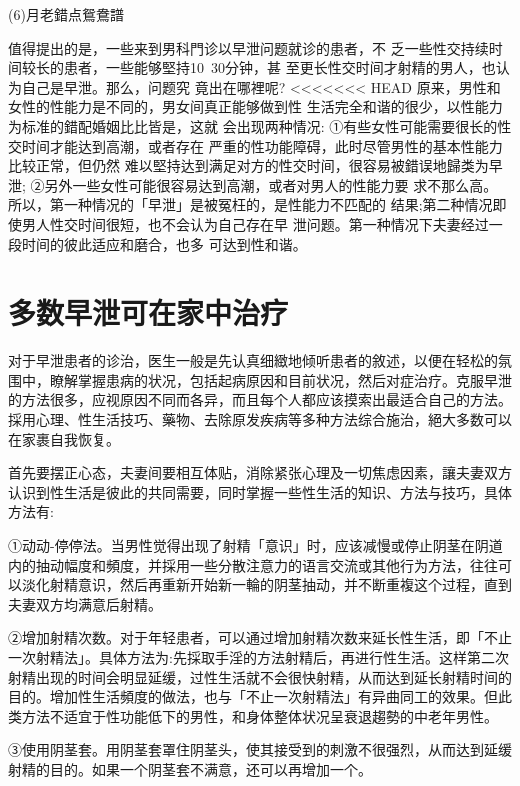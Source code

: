 \documentclass[12pt,UTF8]{ctexbook}
\begin{document}
(6)月老錯点鴛鴦譜

值得提出的是，一些来到男科門诊以早泄问题就诊的患者，不
乏一些性交持续时间较长的患者，一些能够堅持10~30分钟，甚
至更长性交时间才射精的男人，也认为自己是早泄。那么，问题究
竟出在哪裡呢?
<<<<<<< HEAD
原来，男性和女性的性能力是不同的，男女间真正能够做到性
生活完全和谐的很少，以性能力为标准的錯配婚姻比比皆是，这就
会出现两种情况:
①有些女性可能需要很长的性交时间才能达到高潮，或者存在
严重的性功能障碍，此时尽管男性的基本性能力比较正常，但仍然
难以堅持达到满足对方的性交时间，很容易被錯误地歸类为早泄;
②另外一些女性可能很容易达到高潮，或者对男人的性能力要
求不那么高。
所以，第一种情况的「早泄」是被冤枉的，是性能力不匹配的
结果;第二种情况即使男人性交时间很短，也不会认为自己存在早
泄问题。第一种情况下夫妻经过一段时间的彼此适应和磨合，也多
可达到性和谐。

\section{多数早泄可在家中治疗}

对于早泄患者的诊治，医生一般是先认真细緻地倾听患者的敘述，以便在轻松的氛围中，瞭解掌握患病的状况，包括起病原因和目前状况，然后对症治疗。克服早泄的方法很多，应视原因不同而各异，而且每个人都应该摸索出最适合自己的方法。採用心理、性生活技巧、藥物、去除原发疾病等多种方法综合施治，絕大多数可以在家裹自我恢复。

首先要摆正心态，夫妻间要相互体贴，消除紧张心理及一切焦虑因素，讓夫妻双方认识到性生活是彼此的共同需要，同时掌握一些性生活的知识、方法与技巧，具体方法有:

①动动-停停法。当男性觉得出现了射精「意识」时，应该减慢或停止阴茎在阴道内的抽动幅度和頻度，并採用一些分散注意力的语言交流或其他行为方法，往往可以淡化射精意识，然后再重新开始新一輪的阴茎抽动，并不断重複这个过程，直到夫妻双方均满意后射精。

②增加射精次数。对于年轻患者，可以通过增加射精次数来延长性生活，即「不止一次射精法」。具体方法为:先採取手淫的方法射精后，再进行性生活。这样第二次射精出现的时间会明显延缓，过性生活就不会很快射精，从而达到延长射精时间的目的。增加性生活頻度的做法，也与「不止一次射精法」有异曲同工的效果。但此类方法不适宜于性功能低下的男性，和身体整体状况呈衰退趨勢的中老年男性。

③使用阴茎套。用阴茎套罩住阴茎头，使其接受到的刺激不很强烈，从而达到延缓射精的目的。如果一个阴茎套不满意，还可以再增加一个。
\end{document}
